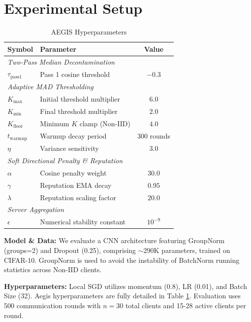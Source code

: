 \documentclass[10pt, conference]{IEEEtran}
\begin{document}
\section{Experimental Setup}

\begin{table}[htbp]
\centering
\caption{AEGIS Hyperparameters}
\label{tab:hyperparams}
\begin{tabular}{@{}llc@{}}
\toprule
\textbf{Symbol} & \textbf{Parameter} & \textbf{Value} \\ \midrule
\multicolumn{3}{l}{\textit{Two-Pass Median Decontamination}} \\
$\tau_{\text{pass1}}$ & Pass 1 cosine threshold & $-0.3$ \\ \midrule
\multicolumn{3}{l}{\textit{Adaptive MAD Thresholding}} \\
$K_{\max}$ & Initial threshold multiplier & $6.0$ \\
$K_{\min}$ & Final threshold multiplier & $2.0$ \\
$K_{\text{floor}}$ & Minimum $K$ clamp (Non-IID) & $4.0$ \\
$t_{\text{warmup}}$ & Warmup decay period & $300$ rounds \\
$\eta$ & Variance sensitivity & $3.0$ \\ \midrule
\multicolumn{3}{l}{\textit{Soft Directional Penalty \& Reputation}} \\
$\alpha$ & Cosine penalty weight & $30.0$ \\
$\gamma$ & Reputation EMA decay & $0.95$ \\
$\lambda$ & Reputation scaling factor & $20.0$ \\ \midrule
\multicolumn{3}{l}{\textit{Server Aggregation}} \\
$\epsilon$ & Numerical stability constant & $10^{-9}$ \\ \bottomrule
\end{tabular}
\end{table}

\textbf{Model \& Data:} We evaluate a CNN architecture featuring GroupNorm (groups=2) and Dropout (0.25), comprising $\sim$290K parameters, trained on CIFAR-10. GroupNorm is used to avoid the instability of BatchNorm running statistics across Non-IID clients. 

\textbf{Hyperparameters:} Local SGD utilizes momentum (0.8), LR (0.01), and Batch Size (32). Aegis hyperparameters are fully detailed in Table \ref{tab:hyperparams}. Evaluation uses 500 communication rounds with $n=30$ total clients and 15-28 active clients per round.
\end{document}
